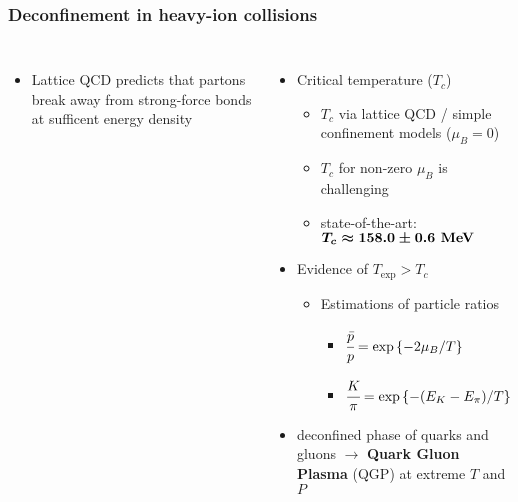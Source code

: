 \begin{frame}
  \frametitle{\textbf{Deconfinement in heavy-ion collisions}}
  \begin{columns}
    \begin{itemize}
    \item Lattice QCD predicts that partons break away from strong-force bonds at sufficent energy density
    \end{itemize}
    \begin{itemize}
    \item Critical temperature ($T_c$)
      \begin{itemize}
      \item $T_c$ via lattice QCD / simple confinement models ($\mu_B = 0$)
      \item $T_c$ for non-zero $\mu_B$ is challenging
      \item state-of-the-art: $\boldmath{T_c \approx 158.0 \pm 0.6 \textbf{ MeV}}$
      \end{itemize}
    \item Evidence of $T_{\text{exp}} > T_c$
      \begin{itemize} 
      \item Estimations of particle ratios
        \begin{itemize}
        \item $\cfrac{\bar{p}}{p} = \exp\left\{-2\mu_B / T \right\}$
        \item $\cfrac{K}{\pi} = \exp\left\{-(E_K - E_\pi)/T  \right\}$
        \end{itemize}
      
   
      
      \end{itemize}

      \item deconfined phase of quarks and gluons $\to$ \textbf{Quark Gluon Plasma} (QGP) at extreme $T$ and $P$


\end{itemize}
\end{columns}
\end{frame}

